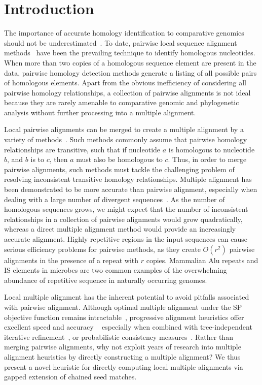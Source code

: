 \documentclass{ws-procs975x65}
\begin{document}

\section{Introduction}
The importance of accurate homology identification to comparative genomics should not be underestimated~\cite{Kumar07}. To date, pairwise local sequence alignment methods~\cite{ref-blastz,ref-ssearch} have been the prevailing technique to identify homologous nucleotides.  When more than two copies of a homologous sequence element are present in the data, pairwise homology detection methods generate a listing of all possible pairs of homologous elements.  Apart from the obvious inefficiency of considering all pairwise homology relationships, a collection of pairwise alignments is not ideal because they are rarely amenable to comparative genomic and phylogenetic analysis without further processing into a multiple alignment.

Local pairwise alignments can be merged to create a multiple alignment by a variety of methods~\cite{ref-tba,ref-aba,ref-dialign,ref-related1}. Such methods commonly assume that pairwise homology relationships are transitive, such that if nucleotide $a$ is homologous to nucleotide $b$, and $b$ is to $c$, then $a$ must also be homologous to $c$.  Thus, in order to merge pairwise alignments, such methods must tackle the challenging problem of resolving inconsistent transitive homology relationships.  Multiple alignment has been demonstrated to be more accurate than pairwise alignment, especially when dealing with a large number of divergent sequences~\cite{ref-mlagan,ref-aubergene}.  As the number of homologous sequences grows, we might expect that the number of inconsistent relationships in a collection of pairwise alignments would grow quadratically, whereas a direct multiple alignment method would provide an increasingly accurate alignment.  Highly repetitive regions in the input sequences can cause serious efficiency problems for pairwise methods, as they create $O(r^{2})$ pairwise alignments in the presence of a repeat with $r$ copies.  Mammalian Alu repeats and IS elements in microbes are two common examples of the overwhelming abundance of repetitive sequence in naturally occurring genomes.

Local multiple alignment has the inherent potential to avoid pitfalls associated with pairwise alignment. Although optimal multiple alignment under the SP objective function remains intractable~\cite{ref-wangjiang}, progressive alignment heuristics offer excellent speed and accuracy
~\cite{ref-clustalw,ref-tcoffee} especially when combined with tree-independent iterative refinement~\cite{ref-muscle}, or probabilistic consistency measures~\cite{ref-probcons}. Rather than merging pairwise alignments, why not exploit years of research into multiple alignment heuristics by directly constructing a multiple alignment? We thus present a novel heuristic for directly computing local multiple alignments via gapped extension of chained seed matches.
\end{document}
